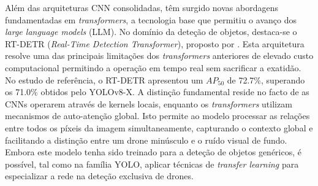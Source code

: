 Além das arquiteturas CNN consolidadas, têm surgido novas abordagens fundamentadas em \emph{transformers}, a tecnologia base que permitiu o avanço dos \emph{large language models} (LLM). No domínio da deteção de objetos, destaca-se o RT-DETR (\emph{Real-Time Detection Transformer}), proposto por \cite{RT-DETR}. Esta arquitetura resolve uma das principais limitações dos \emph{transformers} anteriores de elevado custo computacional permitindo a operação em tempo real sem sacrificar a exatidão. No estudo de referência, o RT-DETR apresentou um $AP_{50}$ de 72.7\%, superando os 71.0\% obtidos pelo YOLOv8-X. A distinção fundamental reside no facto de as CNNs operarem através de kernels locais, enquanto os \emph{transformers} utilizam mecanismos de auto-atenção global. Isto permite ao modelo processar as relações entre todos os píxeis da imagem simultaneamente, capturando o contexto global e facilitando a distinção entre um drone minúsculo e o ruído visual de fundo. Embora este modelo tenha sido treinado para a deteção de objetos genéricos, é possível, tal como na família YOLO, aplicar técnicas de \emph{transfer learning} para especializar a rede na deteção exclusiva de drones.